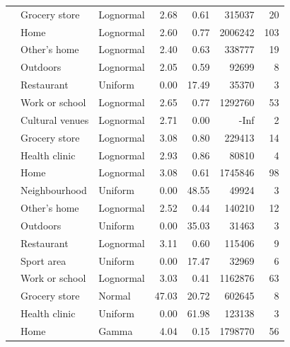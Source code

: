 \documentclass[preprint, 3p,
authoryear]{elsarticle} %
\begin{document}
\begin{table}
{\begin{threeparttable}
\begin{tabular}[t]{rllrrrr}
 & Grocery store & Lognormal & 2.68 & 0.61 & 315037 & 20\\

 & Home & Lognormal & 2.60 & 0.77 & 2006242 & 103\\

 & Other's home & Lognormal & 2.40 & 0.63 & 338777 & 19\\

 & Outdoors & Lognormal & 2.05 & 0.59 & 92699 & 8\\

 & Restaurant & Uniform & 0.00 & 17.49 & 35370 & 3\\

\multirow[t]{-7}{*}{\raggedleft\arraybackslash 2010} & Work or school & Lognormal & 2.65 & 0.77 & 1292760 & 53\\
\cmidrule{1-7}
 & Cultural venues & Lognormal & 2.71 & 0.00 & -Inf & 2\\

 & Grocery store & Lognormal & 3.08 & 0.80 & 229413 & 14\\

 & Health clinic & Lognormal & 2.93 & 0.86 & 80810 & 4\\

 & Home & Lognormal & 3.08 & 0.61 & 1745846 & 98\\

 & Neighbourhood & Uniform & 0.00 & 48.55 & 49924 & 3\\

 & Other's home & Lognormal & 2.52 & 0.44 & 140210 & 12\\

 & Outdoors & Uniform & 0.00 & 35.03 & 31463 & 3\\

 & Restaurant & Lognormal & 3.11 & 0.60 & 115406 & 9\\

 & Sport area & Uniform & 0.00 & 17.47 & 32969 & 6\\

\multirow[t]{-10}{*}{\raggedleft\arraybackslash 2015} & Work or school & Lognormal & 3.03 & 0.41 & 1162876 & 63\\
\cmidrule{1-7}
 & Grocery store & Normal & 47.03 & 20.72 & 602645 & 8\\

 & Health clinic & Uniform & 0.00 & 61.98 & 123138 & 3\\

 & Home & Gamma & 4.04 & 0.15 & 1798770 & 56\\


\end{tabular}
\end{threeparttable}}
\end{table}
\end{document}
